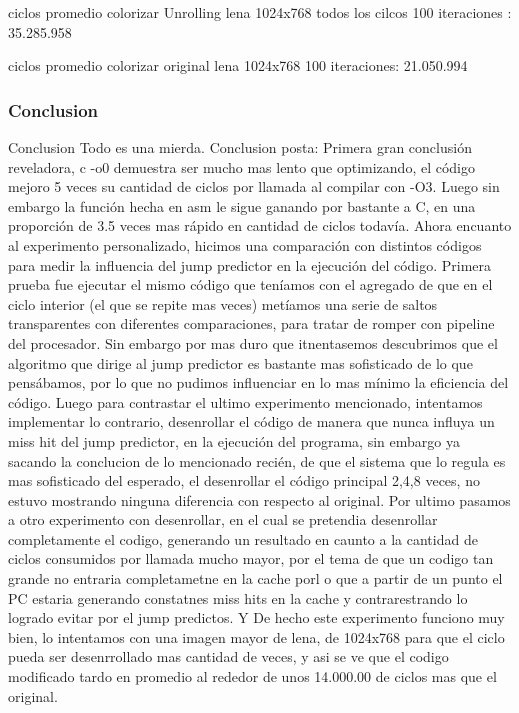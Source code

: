 	ciclos promedio colorizar Unrolling lena 1024x768
	 todos los cilcos 100 iteraciones : 35.285.958
	
	ciclos promedio colorizar original lena 1024x768 100 iteraciones:	21.050.994
	
	
	
\subsubsection{Conclusion}
Conclusion Todo es una mierda.
Conclusion posta:
 Primera gran conclusión reveladora, c -o0 demuestra ser mucho mas lento que optimizando, el código mejoro 5 veces su cantidad de ciclos por llamada al compilar con -O3.
  Luego sin embargo la función hecha en  asm le sigue ganando por bastante a C, en una proporción de 3.5 veces mas rápido en cantidad de ciclos todavía.
  Ahora encuanto al experimento personalizado, hicimos una comparación con distintos códigos para medir la influencia del jump predictor en la ejecución del código. Primera prueba fue ejecutar el mismo código que teníamos con el agregado de que en el ciclo interior (el que se repite mas veces) metíamos una serie de saltos transparentes con diferentes comparaciones, para tratar de romper con pipeline del procesador. Sin embargo por mas duro que itnentasemos descubrimos que el algoritmo que dirige al jump predictor es bastante mas sofisticado de lo que pensábamos, por lo que no pudimos influenciar en lo mas mínimo la eficiencia del código. 
   Luego para contrastar el ultimo experimento mencionado, intentamos implementar lo contrario, desenrollar el código de manera que nunca influya un miss hit del jump predictor, en la ejecución del programa, sin embargo ya sacando la conclucion de lo mencionado recién, de que el sistema que lo regula es mas sofisticado del esperado, el desenrollar el código principal 2,4,8 veces, no estuvo mostrando ninguna diferencia con respecto al original. 
   Por ultimo pasamos a otro experimento con desenrollar, en el cual se pretendia desenrollar completamente el codigo, generando un resultado en caunto a la cantidad de ciclos consumidos por llamada mucho mayor, por el tema de que un codigo tan grande no entraria completametne en la cache porl o que a partir de un punto el PC estaria generando constatnes miss hits en la cache y contrarestrando lo logrado evitar por el jump predictos. Y De hecho este experimento funciono muy bien, lo intentamos con una imagen mayor de lena, de 1024x768 para que el ciclo pueda ser desenrrollado mas cantidad de veces, y asi se ve que el codigo modificado tardo en promedio al rededor de unos 14.000.00 de ciclos mas que el original.
